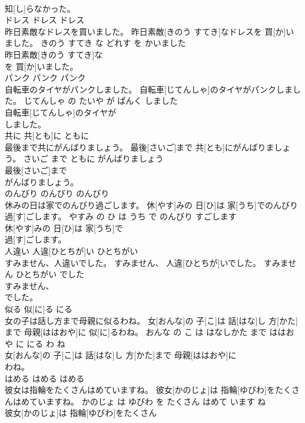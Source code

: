 \documentclass[8pt]{extreport}
\begin{document}
\begin{CJK}{UTF8}{min}
\\	知[し]らなかった。			
\\	ドレス	ドレス	ドレス	
\\	昨日素敵なドレスを買いました。	昨日素敵[きのう すてき]なドレスを 買[か]いました。	きのう すてき な どれす を かいました	
\\	昨日素敵[きのう すてき]な
\\	を 買[か]いました。			
\\	パンク	パンク	パンク	
\\	自転車のタイヤがパンクしました。	自転車[じてんしゃ]のタイヤがパンクしました。	じてんしゃ の たいや が ぱんく しました	
\\	自転車[じてんしゃ]のタイヤが
\\	しました。			
\\	共に	共[とも]に	ともに	
\\	最後まで共にがんばりましょう。	最後[さいご]まで 共[とも]にがんばりましょう。	さいご まで ともに がんばりましょう	
\\	最後[さいご]まで
\\	がんばりましょう。			
\\	のんびり	のんびり	のんびり	
\\	休みの日は家でのんびり過ごします。	休[やす]みの 日[ひ]は 家[うち]でのんびり 過[す]ごします。	やすみ の ひ は うち で のんびり すごします	
\\	休[やす]みの 日[ひ]は 家[うち]で
\\	過[す]ごします。			
\\	人違い	人違[ひとちが]い	ひとちがい	
\\	すみません、人違いでした。	すみません、 人違[ひとちが]いでした。	すみません ひとちがい でした	
\\	すみません、
\\	でした。			
\\	似る	似[に]る	にる	
\\	女の子は話し方まで母親に似るわね。	女[おんな]の 子[こ]は 話[はな]し 方[かた]まで 母親[ははおや]に 似[に]るわね。	おんな の こ は はなしかた まで ははおや に にる わ ね	
\\	女[おんな]の 子[こ]は 話[はな]し 方[かた]まで 母親[ははおや]に
\\	わね。			
\\	はめる	はめる	はめる	
\\	彼女は指輪をたくさんはめていますね。	彼女[かのじょ]は 指輪[ゆびわ]をたくさんはめていますね。	かのじょ は ゆびわ を たくさん はめて います ね	
\\	彼女[かのじょ]は 指輪[ゆびわ]をたくさん

\end{CJK}
\end{document}
